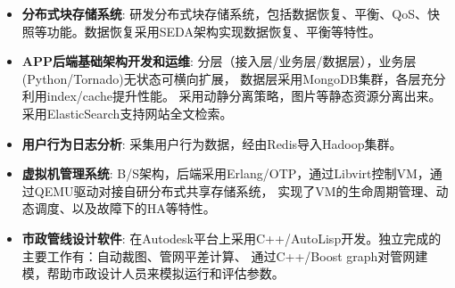   \begin{itemize}[leftmargin=*]
    \item \textbf{分布式块存储系统}: 研发分布式块存储系统，包括数据恢复、平衡、QoS、快照等功能。数据恢复采用SEDA架构实现数据恢复、平衡等特性。

    \item \textbf{APP后端基础架构开发和运维}: 分层（接入层/业务层/数据层），业务层(Python/Tornado)无状态可横向扩展，
        数据层采用MongoDB集群，各层充分利用index/cache提升性能。
        采用动静分离策略，图片等静态资源分离出来。采用ElasticSearch支持网站全文检索。

    \item \textbf{用户行为日志分析}: 采集用户行为数据，经由Redis导入Hadoop集群。

    \item \textbf{虚拟机管理系统}: B/S架构，后端采用Erlang/OTP，通过Libvirt控制VM，通过QEMU驱动对接自研分布式共享存储系统，
        实现了VM的生命周期管理、动态调度、以及故障下的HA等特性。

    \item \textbf{市政管线设计软件}: 在Autodesk平台上采用C++/AutoLisp开发。独立完成的主要工作有：自动裁图、管网平差计算、
        通过C++/Boost graph对管网建模，帮助市政设计人员来模拟运行和评估参数。
  \end{itemize}
